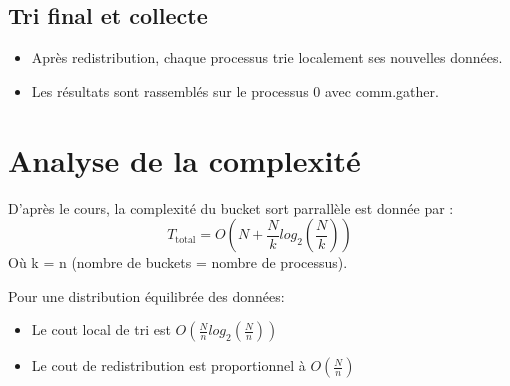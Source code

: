 \documentclass[a4paper,13pt]{book}
\begin{document}
 \subsection{Tri final et collecte}
 \begin{itemize}
  \item Après redistribution, chaque processus trie localement ses nouvelles données.
  \item Les résultats sont rassemblés sur le processus 0 avec comm.gather.
 \end{itemize}

\section{Analyse de la complexité}
D'après le cours, la complexité du bucket sort parrallèle est donnée par :
\[
  T_{\text{total}} = O(N + \frac{N}{k} log_2 (\frac{N}{k}))
\]
Où k = n (nombre de buckets = nombre de processus).

Pour une distribution équilibrée des données: 
\begin{itemize}
  \item Le cout local de tri est $O(\frac{N}{n}log_2 (\frac{N}{n}))$
  \item Le cout de redistribution est proportionnel à $O(\frac{N}{n})$
\end{itemize}
\end{document}
